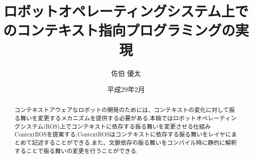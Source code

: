 \documentclass[a4paper,12pt]{jreport}
\title{ロボットオペレーティングシステム上でのコンテキスト指向プログラミングの実現}
\author{佐伯 優太}
\date{平成29年2月}
\begin{document}
\maketitle
\thispagestyle{empty}

\begin{abstract}
コンテキストアウェアなロボットの開発のためには、コンテキストの変化に対して振る舞いを変更するメカニズムを提供する必要がある.本稿ではロボットオペレーティングシステム(ROS)上でコンテキストに依存する振る舞いを変更させる仕組みContextROSを提案する.ContextROSはコンテキストに依存する振る舞いをレイヤにまとめて記述することができる.また、文脈依存の振る舞いをコンパイル時に静的に解釈することで振る舞いの変更を行うことができる.
\end{abstract}

\setcounter{page}{0}
\tableofcontents

 


%










%


\end{document}
